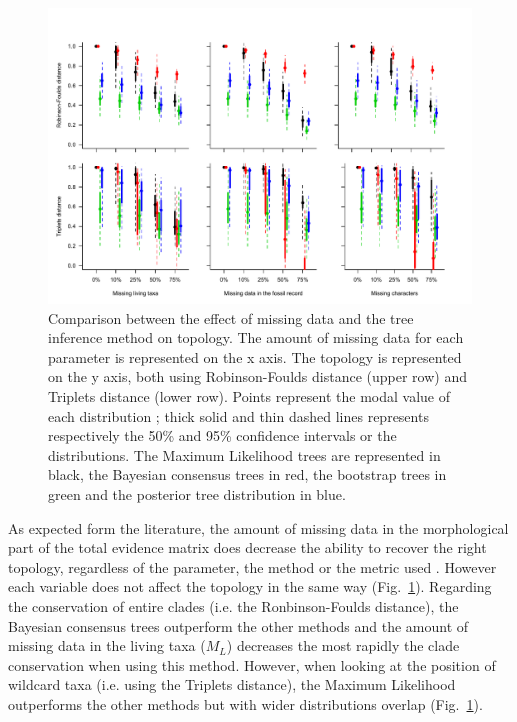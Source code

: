 \documentclass[12pt,letterpaper]{article}
\begin{document}
\begin{figure} 
\centering
    \includegraphics[width=1\textwidth]{Figures/In_main/AllMethods-RF+Tr-colour.pdf}
\caption{Comparison between the effect of missing data and the tree inference method on topology. The amount of missing data for each parameter is represented on the x axis. The topology is represented on the y axis, both using Robinson-Foulds distance (upper row) and Triplets distance (lower row). Points represent the modal value of each distribution ; thick solid and thin dashed lines represents respectively the 50\% and 95\% confidence intervals or the distributions. The Maximum Likelihood trees are represented in black, the Bayesian consensus trees in red, the bootstrap trees in green and the posterior tree distribution in blue.}
\label{Fig_Results-permeth_perparam} %
\end{figure}

As expected form the literature, the amount of missing data in the morphological part of the total evidence matrix does decrease the ability to recover the right topology, regardless of the parameter, the method or the metric used \citep[e.g.][]{rouresite-specific2011,sansomfossilization2013,pattinsonphylogeny2014}. However each variable does not affect the topology in the same way (Fig.~\ref{Fig_Results-permeth_perparam}). Regarding the conservation of entire clades (i.e. the Ronbinson-Foulds distance), the Bayesian consensus trees outperform the other methods and the amount of missing data in the living taxa ($M_{L}$) decreases the most rapidly the clade conservation when using this method. However, when looking at the position of wildcard taxa (i.e. using the Triplets distance), the Maximum Likelihood outperforms the other methods but with wider distributions overlap (Fig.~\ref{Fig_Results-permeth_perparam}).
\end{document}

